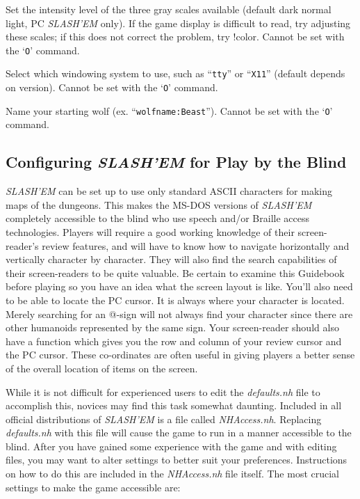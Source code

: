 \item[\ib{videoshades}]
Set the intensity level of the three gray scales available
(default dark normal light, PC {\it SLASH'EM\/} only).
If the game display is difficult to read, try adjusting these scales;
if this does not correct the problem, try !color.
Cannot be set with the `{\tt O}' command.

\item[\ib{windowtype}]
Select which windowing system to use, such as ``{\tt tty}'' or ``{\tt X11}''
(default depends on version).
Cannot be set with the `{\tt O}' command.

\item[\ib{wolfname}]
Name your starting wolf (ex. ``{\tt wolfname:Beast}'').
Cannot be set with the `{\tt O}' command.
\elist
\nd %
\subsection*{Configuring {\it SLASH'EM\/} for Play by the Blind}


{\it SLASH'EM\/} can be set up to use only standard ASCII characters for making
maps of the dungeons. This makes the MS-DOS versions of {\it SLASH'EM\/} completely
accessible to the blind who use speech and/or Braille access technologies.
Players will require a good working knowledge of their screen-reader's
review features, and will have to know how to navigate horizontally and
vertically character by character. They will also find the search
capabilities of their screen-readers to be quite valuable. Be certain to
examine this Guidebook before playing so you have an idea what the screen
layout is like. You'll also need to be able to locate the PC cursor. It is
always where your character is located. Merely searching for an @-sign will
not always find your character since there are other humanoids represented
by the same sign. Your screen-reader should also have a function which
gives you the row and column of your review cursor and the PC cursor.
These co-ordinates are often useful in giving players a better sense of the
overall location of items on the screen.

While it is not difficult for experienced users to edit the {\it defaults.nh\/}
file to accomplish this, novices may find this task somewhat daunting.
Included in all official distributions of {\it SLASH'EM\/} is a file called
{\it NHAccess.nh}.  Replacing {\it defaults.nh\/} with this file will cause
the game to run in a manner accessible to the blind. After you have gained
some experience with the game and with editing files, you may want to alter
settings to better suit your preferences. Instructions on how to do this
are included in the {\it NHAccess.nh\/} file itself. The most crucial settings to
make the game accessible are:

